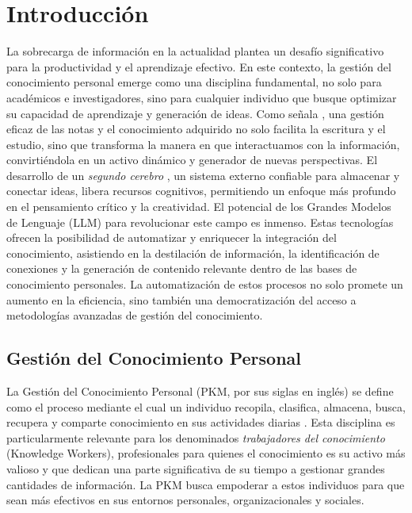 \chapter{Introducción}
\label{chapter:introduccion}

La sobrecarga de información en la actualidad plantea un desafío significativo para la productividad y el aprendizaje efectivo. En este contexto, la gestión del conocimiento personal emerge como una disciplina fundamental, no solo para académicos e investigadores, sino para cualquier individuo que busque optimizar su capacidad de aprendizaje y generación de ideas. Como señala \cite{ahrensHowTakeSmart2017}, una gestión eficaz de las notas y el conocimiento adquirido no solo facilita la escritura y el estudio, sino que transforma la manera en que interactuamos con la información, convirtiéndola en un activo dinámico y generador de nuevas perspectivas. El desarrollo de un \textit{segundo cerebro} \citep{forteBuildingSecondBrain2022}, un sistema externo confiable para almacenar y conectar ideas, libera recursos cognitivos, permitiendo un enfoque más profundo en el pensamiento crítico y la creatividad.
El potencial de los Grandes Modelos de Lenguaje (LLM) para revolucionar este campo es inmenso. Estas tecnologías ofrecen la posibilidad de automatizar y enriquecer la integración del conocimiento, asistiendo en la destilación de información, la identificación de conexiones y la generación de contenido relevante dentro de las bases de conocimiento personales. La automatización de estos procesos no solo promete un aumento en la eficiencia, sino también una democratización del acceso a metodologías avanzadas de gestión del conocimiento.

\section{Gestión del Conocimiento Personal}
\label{sec:pkm}
La Gestión del Conocimiento Personal (PKM, por sus siglas en inglés) se define como el proceso mediante el cual un individuo recopila, clasifica, almacena, busca, recupera y comparte conocimiento en sus actividades diarias \citep{grundspenkisAgentBasedApproach2007}. Esta disciplina es particularmente relevante para los denominados \textit{trabajadores del conocimiento} (Knowledge Workers), profesionales para quienes el conocimiento es su activo más valioso y que dedican una parte significativa de su tiempo a gestionar grandes cantidades de información. La PKM busca empoderar a estos individuos para que sean más efectivos en sus entornos personales, organizacionales y sociales.

